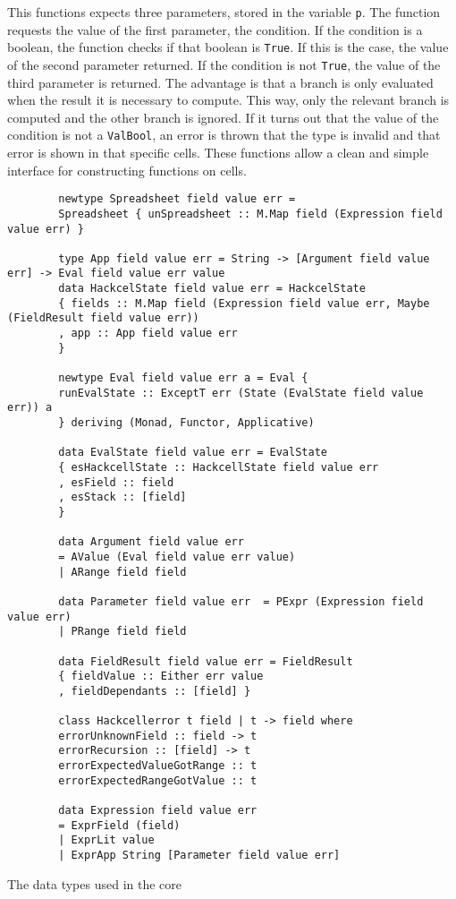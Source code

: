 \documentclass{article}
\begin{document}
This functions expects three parameters, stored in the variable \texttt{p}. The function requests the value of the first parameter, the condition. If the condition is a boolean, the function checks if that boolean is \texttt{True}. If this is the case, the value of the second parameter returned. If the condition is not \texttt{True}, the value of the third parameter is returned. The advantage is that a branch is only evaluated when the result it is necessary to compute. This way, only the relevant branch is computed and the other branch is ignored. If it turns out that the value of the condition is not a \texttt{ValBool}, an error is thrown that the type is invalid and that error is shown in that specific cells. These functions allow a clean and simple interface for constructing functions on cells. 
	\begin{listing}
		\begin{verbatim}
		newtype Spreadsheet field value err =
		Spreadsheet { unSpreadsheet :: M.Map field (Expression field value err) }
		
		type App field value err = String -> [Argument field value err] -> Eval field value err value
		data HackcelState field value err = HackcelState
		{ fields :: M.Map field (Expression field value err, Maybe (FieldResult field value err))
		, app :: App field value err
		}
		
		newtype Eval field value err a = Eval {
		runEvalState :: ExceptT err (State (EvalState field value err)) a
		} deriving (Monad, Functor, Applicative)
		
		data EvalState field value err = EvalState
		{ esHackcellState :: HackcellState field value err
		, esField :: field
		, esStack :: [field]
		}
		
		data Argument field value err
		= AValue (Eval field value err value)
		| ARange field field
		
		data Parameter field value err  = PExpr (Expression field value err)
		| PRange field field
		
		data FieldResult field value err = FieldResult
		{ fieldValue :: Either err value
		, fieldDependants :: [field] }
		
		class Hackcellerror t field | t -> field where
		errorUnknownField :: field -> t
		errorRecursion :: [field] -> t
		errorExpectedValueGotRange :: t
		errorExpectedRangeGotValue :: t
		
		data Expression field value err
		= ExprField (field)
		| ExprLit value
		| ExprApp String [Parameter field value err]
		\end{verbatim}
		\caption{The data types used in the core}
		\label{listing:datatypes}
	\end{listing}
	
\end{document}
